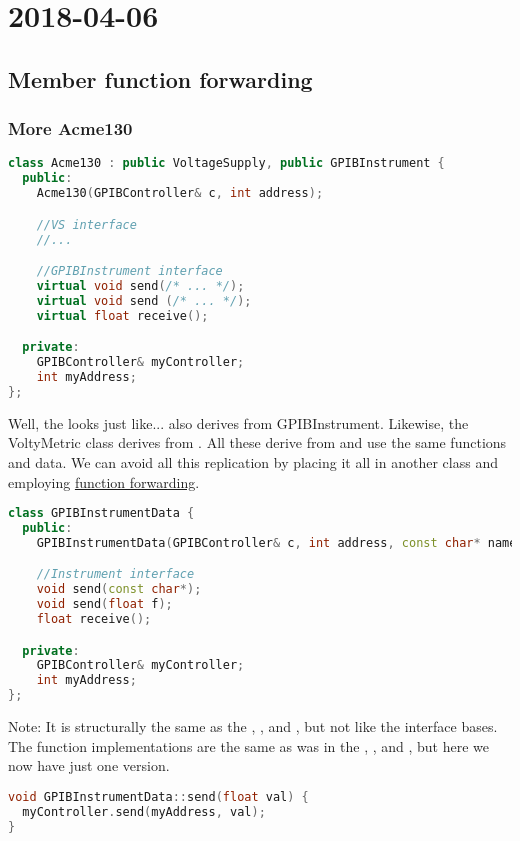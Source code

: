 \section{2018-04-06}

\subsection{Member function forwarding}

\subsubsection{More Acme130}

\begin{lstlisting}[language=C++]
class Acme130 : public VoltageSupply, public GPIBInstrument {
  public:
    Acme130(GPIBController& c, int address);

    //VS interface
    //...

    //GPIBInstrument interface
    virtual void send(/* ... */);
    virtual void send (/* ... */);
    virtual float receive();

  private:
    GPIBController& myController;
    int myAddress; 
};
\end{lstlisting}

Well, the  looks just like... also derives from GPIBInstrument. Likewise, the VoltyMetric class derives from . All these derive from  and use the same functions and data. We can avoid all this replication by placing it all in another class and employing \underline{function forwarding}. 

\begin{lstlisting}[language=C++]
class GPIBInstrumentData {
  public:
    GPIBInstrumentData(GPIBController& c, int address, const char* name);

    //Instrument interface
    void send(const char*);
    void send(float f);
    float receive();

  private:
    GPIBController& myController;
    int myAddress;
};
\end{lstlisting}

Note: It is structurally the same as the , , and , but not like the interface bases. The function implementations are the same as was in the , , and , but here we now have just one version. 

\begin{lstlisting}[language=C++]
void GPIBInstrumentData::send(float val) {
  myController.send(myAddress, val);
}
\end{lstlisting}

